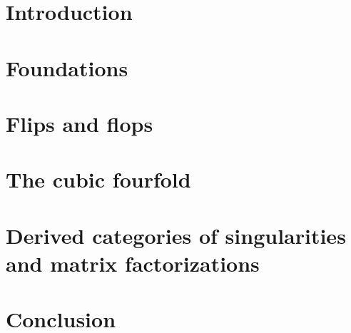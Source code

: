 
\section{Introduction}

\newpage

\section{Foundations}

\newpage

\section{Flips and flops}

\newpage

\section{The cubic fourfold}

\newpage

\section{Derived categories of singularities and matrix factorizations}

\newpage

\section{Conclusion}

